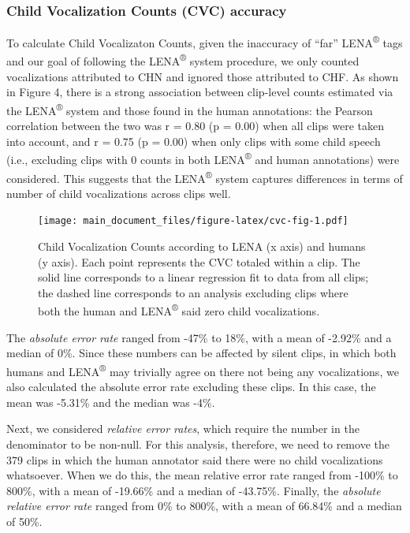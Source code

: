 \documentclass[english,table,man,floatsintext]{apa6}
\begin{document}
\subsubsection{Child Vocalization Counts (CVC)
accuracy}\label{child-vocalization-counts-cvc-accuracy}

To calculate Child Vocalizaton Counts, given the inaccuracy of
\enquote{far} LENA\textsuperscript{®} tags and our goal of following the
LENA\textsuperscript{®} system procedure, we only counted vocalizations
attributed to CHN and ignored those attributed to CHF. As shown in
Figure 4, there is a strong association between clip-level counts
estimated via the LENA\textsuperscript{®} system and those found in the
human annotations: the Pearson correlation between the two was r = 0.80
(p = 0.00) when all clips were taken into account, and r = 0.75 (p =
0.00) when only clips with some child speech (i.e., excluding clips with
0 counts in both LENA\textsuperscript{®} and human annotations) were
considered. This suggests that the LENA\textsuperscript{®} system
captures differences in terms of number of child vocalizations across
clips well.

\begin{figure}
\centering
\texttt{[image: main\_document\_files/figure-latex/cvc-fig-1.pdf]}
\caption{\label{fig:cvc-fig}Child Vocalization Counts according to LENA (x
axis) and humans (y axis). Each point represents the CVC totaled within
a clip. The solid line corresponds to a linear regression fit to data
from all clips; the dashed line corresponds to an analysis excluding
clips where both the human and LENA\textsuperscript{®} said zero child
vocalizations.}
\end{figure}

The \emph{absolute error rate} ranged from -47\% to 18\%, with a mean of
-2.92\% and a median of 0\%. Since these numbers can be affected by
silent clips, in which both humans and LENA\textsuperscript{®} may
trivially agree on there not being any vocalizations, we also calculated
the absolute error rate excluding these clips. In this case, the mean
was -5.31\% and the median was -4\%.

Next, we considered \emph{relative error rates}, which require the
number in the denominator to be non-null. For this analysis, therefore,
we need to remove the 379 clips in which the human annotator said there
were no child vocalizations whatsoever. When we do this, the mean
relative error rate ranged from -100\% to 800\%, with a mean of -19.66\%
and a median of -43.75\%. Finally, the \emph{absolute relative error
rate} ranged from 0\% to 800\%, with a mean of 66.84\% and a median of
50\%.
\end{document}
